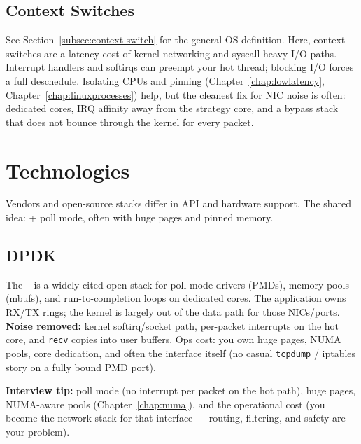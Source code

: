 \subsection{Context Switches}
\label{subsec:kernel-bypass-context-switches}
See Section~\ref{subsec:context-switch} for the general OS definition. 
Here, context switches are a latency cost of kernel networking and syscall-heavy I/O paths.
\newline
Interrupt handlers and softirqs can preempt your hot thread; blocking I/O forces a full 
deschedule. Isolating CPUs and pinning 
(Chapter~\ref{chap:lowlatency}, Chapter~\ref{chap:linuxprocesses}) help, but the cleanest 
fix for NIC noise is often: dedicated cores, IRQ affinity away from the strategy core, 
and a bypass stack that does not bounce through the kernel for every packet.

\section{Technologies}
\label{sec:kernel-bypass-technologies}
Vendors and open-source stacks differ in API and hardware support. The shared idea: 
 + poll mode, often with huge pages and pinned memory.

\subsection{DPDK}
\label{subsec:dpdk}
The ~\cite{dpdk-docs} is a widely cited open stack for 
poll-mode drivers (PMDs), memory pools (mbufs), and run-to-completion loops on dedicated 
cores. The application owns RX/TX rings; the kernel is largely out of the data path for 
those NICs/ports.
\newline
\textbf{Noise removed:} kernel softirq/socket path, per-packet interrupts on the hot core, 
and \texttt{recv} copies into user buffers. Ops cost: you own huge pages, NUMA pools, 
core dedication, and often the interface itself (no casual \texttt{tcpdump} / iptables story 
on a fully bound PMD port).
\par\noindent\textbf{Interview tip:} poll mode (no interrupt per packet on the hot path), huge pages, NUMA-aware 
pools (Chapter~\ref{chap:numa}), and the operational cost (you become the network stack for 
that interface --- routing, filtering, and safety are your problem).

